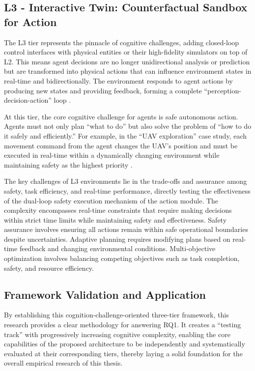 \subsection{L3 - Interactive Twin: Counterfactual Sandbox for Action}

The L3 tier represents the pinnacle of cognitive challenges, adding closed-loop control interfaces with physical entities or their high-fidelity simulators on top of L2. This means agent decisions are no longer unidirectional analysis or prediction but are transformed into physical actions that can influence environment states in real-time and bidirectionally. The environment responds to agent actions by producing new states and providing feedback, forming a complete ``perception-decision-action'' loop \cite{thrun2002probabilistic}.

At this tier, the core cognitive challenge for agents is safe autonomous action. Agents must not only plan ``what to do'' but also solve the problem of ``how to do it safely and efficiently.'' For example, in the ``UAV exploration'' case study, each movement command from the agent changes the UAV's position and must be executed in real-time within a dynamically changing environment while maintaining safety as the highest priority \cite{grande2012scan}.

The key challenges of L3 environments lie in the trade-offs and assurance among safety, task efficiency, and real-time performance, directly testing the effectiveness of the dual-loop safety execution mechanism of the action module. The complexity encompasses real-time constraints that require making decisions within strict time limits while maintaining safety and effectiveness. Safety assurance involves ensuring all actions remain within safe operational boundaries despite uncertainties. Adaptive planning requires modifying plans based on real-time feedback and changing environmental conditions. Multi-objective optimization involves balancing competing objectives such as task completion, safety, and resource efficiency.

\subsection{Framework Validation and Application}

By establishing this cognition-challenge-oriented three-tier framework, this research provides a clear methodology for answering RQ1. It creates a ``testing track'' with progressively increasing cognitive complexity, enabling the core capabilities of the proposed architecture to be independently and systematically evaluated at their corresponding tiers, thereby laying a solid foundation for the overall empirical research of this thesis.

